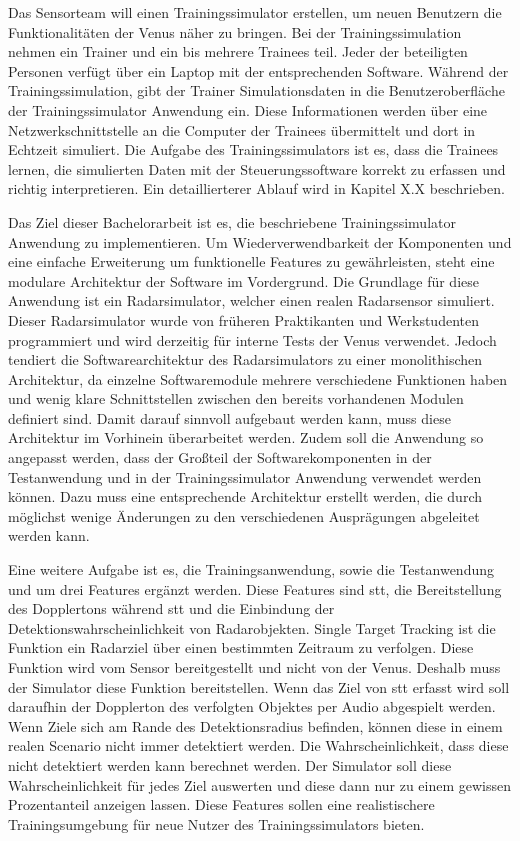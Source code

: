 Das Sensorteam will einen Trainingssimulator erstellen, um neuen Benutzern die Funktionalitäten der Venus näher zu bringen. Bei der Trainingssimulation nehmen ein Trainer und ein bis mehrere Trainees teil. Jeder der beteiligten Personen verfügt über ein Laptop mit der entsprechenden Software. Während der Trainingssimulation, gibt der Trainer Simulationsdaten in die Benutzeroberfläche der Trainingssimulator Anwendung ein. Diese Informationen werden über eine Netzwerkschnittstelle an die Computer der Trainees übermittelt und dort in Echtzeit simuliert. Die Aufgabe des Trainingssimulators ist es, dass die Trainees lernen, die simulierten Daten mit der Steuerungssoftware korrekt zu erfassen und richtig interpretieren. Ein detaillierterer Ablauf wird in Kapitel X.X beschrieben.

Das Ziel dieser Bachelorarbeit ist es, die beschriebene Trainingssimulator Anwendung zu implementieren. Um Wiederverwendbarkeit der Komponenten und eine einfache Erweiterung um funktionelle Features zu gewährleisten, steht eine modulare Architektur der Software im Vordergrund. Die Grundlage für diese Anwendung ist ein Radarsimulator, welcher einen realen Radarsensor simuliert. Dieser Radarsimulator wurde von früheren Praktikanten und Werkstudenten programmiert und wird derzeitig für interne Tests der Venus verwendet. Jedoch tendiert die Softwarearchitektur des Radarsimulators zu einer monolithischen Architektur, da einzelne Softwaremodule mehrere verschiedene Funktionen haben und wenig klare Schnittstellen zwischen den bereits vorhandenen Modulen definiert sind. Damit darauf sinnvoll aufgebaut werden kann, muss diese Architektur im Vorhinein überarbeitet werden. Zudem soll die Anwendung so angepasst werden, dass der Großteil der Softwarekomponenten in der Testanwendung und in der Trainingssimulator Anwendung verwendet werden können. Dazu muss eine entsprechende Architektur erstellt werden, die durch möglichst wenige Änderungen zu den verschiedenen Ausprägungen abgeleitet werden kann.

Eine weitere Aufgabe ist es, die Trainingsanwendung, sowie die Testanwendung und um drei Features ergänzt werden. Diese Features sind \acrfull{stt}, die Bereitstellung des Dopplertons während \acrshort{stt} und die Einbindung der Detektionswahrscheinlichkeit von Radarobjekten. Single Target Tracking ist die Funktion ein Radarziel über einen bestimmten Zeitraum zu verfolgen. Diese Funktion wird vom Sensor bereitgestellt und nicht von der Venus. Deshalb muss der Simulator diese Funktion bereitstellen. Wenn das Ziel von \acrshort{stt} erfasst wird soll daraufhin der Dopplerton des verfolgten Objektes per Audio abgespielt werden. Wenn Ziele sich am Rande des Detektionsradius befinden, können diese in einem realen Scenario nicht immer detektiert werden. Die Wahrscheinlichkeit, dass diese nicht detektiert werden kann berechnet werden. Der Simulator soll diese Wahrscheinlichkeit für jedes Ziel auswerten und diese dann nur zu einem gewissen Prozentanteil anzeigen lassen. Diese Features sollen eine realistischere Trainingsumgebung für neue Nutzer des Trainingssimulators bieten.

